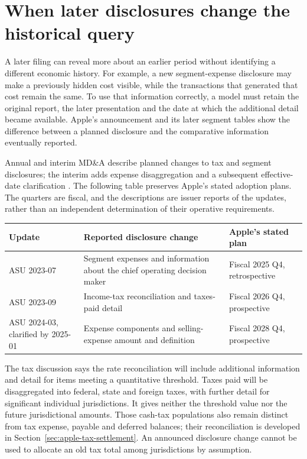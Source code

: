 \section{When later disclosures change the historical query}
\label{sec:apple-pronouncements}

A later filing can reveal more about an earlier period without identifying a
different economic history. For example, a new segment-expense disclosure may
make a previously hidden cost visible, while the transactions that generated
that cost remain the same. To use that information correctly, a model must
retain the original report, the later presentation and the date at which the
additional detail became available. Apple's announcement and its later
segment tables show the difference between a planned disclosure and the
comparative information eventually reported.

Annual and interim MD\&A describe planned changes to tax and segment disclosures;
the interim adds expense disaggregation and a subsequent effective-date
clarification \citep[Recent Accounting Pronouncements, printed p.~26]{apple2024}
\citep[Recent Accounting Pronouncements, printed p.~17]{apple2025q1}.
The following table preserves Apple's stated adoption plans. The quarters are
fiscal, and the descriptions are issuer reports of the updates, rather than an
independent determination of their operative requirements.
\begin{center}
\small
\begin{tabular}{p{}p{}p{}}
\toprule
Update & Reported disclosure change & Apple's stated plan\\\midrule
ASU 2023-07 & Segment expenses and information about the chief operating
decision maker & Fiscal 2025 Q4, retrospective\\
ASU 2023-09 & Income-tax reconciliation and taxes-paid detail & Fiscal 2026 Q4,
prospective\\
ASU 2024-03, clarified by 2025-01 & Expense components and selling-expense
amount and definition & Fiscal 2028 Q4, prospective\\\bottomrule
\end{tabular}
\end{center}

The tax discussion says the rate reconciliation will include additional
information and detail for items meeting a quantitative threshold. Taxes paid
will be disaggregated into federal, state and foreign taxes, with further detail
for significant individual jurisdictions. It gives neither the threshold value
nor the future jurisdictional amounts. Those cash-tax populations also remain
distinct from tax expense, payable and deferred balances; their reconciliation
is developed in Section~\ref{sec:apple-tax-settlement}.
An announced disclosure change cannot be used to allocate an old tax total
among jurisdictions by assumption.

